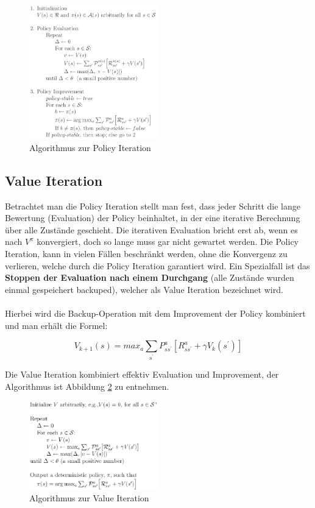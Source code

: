 \documentclass[10pt]{scrartcl}
\begin{document}
\begin{figure}[htbp]
	\centering	\includegraphics[width=0.5\textwidth]{Bilder/Policy.png}
	\caption{Algorithmus zur Policy Iteration}
	\label{fig:Policy}
\end{figure}


\subsection{Value Iteration}
Betrachtet man die Policy Iteration stellt man fest, dass jeder Schritt die lange Bewertung (Evaluation) der Policy beinhaltet, in der eine iterative Berechnung über alle Zustände geschieht. Die iterativen Evaluation bricht erst ab, wenn es nach $V^{\pi}$ konvergiert, doch so lange muss gar nicht gewartet werden. Die Policy Iteration, kann in vielen Fällen beschränkt werden, ohne die Konvergenz zu verlieren, welche durch die Policy Iteration garantiert wird. Ein Spezialfall ist das \textbf{Stoppen der Evaluation nach einem Durchgang} (alle Zustände wurden einmal gespeichert \glqq backuped\grqq\xspace), welcher als Value Iteration bezeichnet wird.\\
\\
Hierbei wird die Backup-Operation mit dem Improvement der Policy kombiniert und man erhält die Formel:

\begin{equation}
V_{k+1}(s) = max_{a} \sum_{s^{'}} P^a_{ss^{'}} [R^a_{ss^{'}} + \gamma V_{k} (s^{'})]
\end{equation}

Die Value Iteration kombiniert effektiv Evaluation und Improvement, der Algorithmus ist Abbildung \ref{fig:Value} zu entnehmen.

\begin{figure}[htbp]
	\centering	\includegraphics[width=0.5\textwidth]{Bilder/Value.png}
	\caption{Algorithmus zur Value Iteration}
	\label{fig:Value}
\end{figure}
\end{document}
